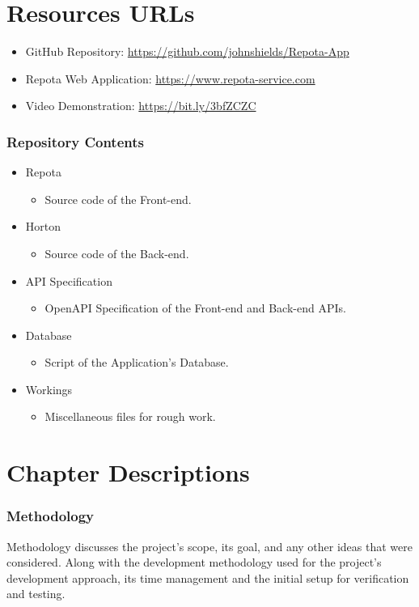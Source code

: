 \newpage
\section{Resources URLs}
\begin{itemize}
    \item GitHub Repository: 
    \url{https://github.com/johnshields/Repota-App}
    \item Repota Web Application: 
    \url{https://www.repota-service.com}
    \item Video Demonstration: 
    \url{https://bit.ly/3bfZCZC}
\end{itemize}

\subsubsection{Repository Contents}
\begin{itemize}
  \item Repota
    \begin{itemize}
    \item Source code of the Front-end.
    \end{itemize}
  \item Horton
    \begin{itemize}
    \item Source code of the Back-end.
    \end{itemize}
  \item API Specification
    \begin{itemize}
    \item OpenAPI Specification of the Front-end and Back-end APIs.
    \end{itemize}
  \item Database
    \begin{itemize}
    \item Script of the Application's Database.
    \end{itemize}
  \item Workings
    \begin{itemize}
    \item Miscellaneous files for rough work. 
    \end{itemize}
\end{itemize}

\newpage
\section{Chapter Descriptions}
\subsubsection{Methodology}
Methodology discusses the project's scope, its goal, and any other ideas that were considered. Along with the development methodology used for the project's development approach, its time management and the initial setup for verification and testing.

